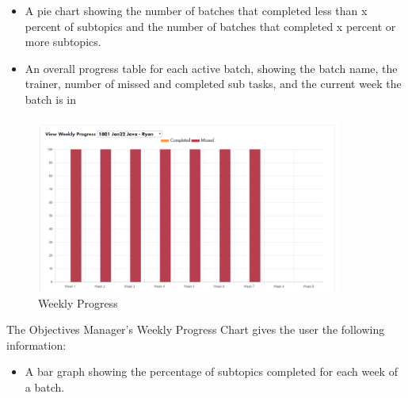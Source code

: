\begin{itemize}
    \item A pie chart showing the number of batches that completed less than x percent of subtopics and the number of batches that completed x percent or more subtopics.
    \item An overall progress table for each active batch, showing the batch name, the trainer, number of missed and completed sub tasks, and the current week the batch is in
\end{itemize}

\begin{figure}[htp]
\centering
\includegraphics[width=10cm]{images/WeeklyObj}
\caption{Weekly Progress}
\label{fig:lion}
\end{figure}

The Objectives Manager’s Weekly Progress Chart gives the user the following information:
\begin{itemize}
    \item A bar graph showing the percentage of subtopics completed for each week of a batch.
\end{itemize}
